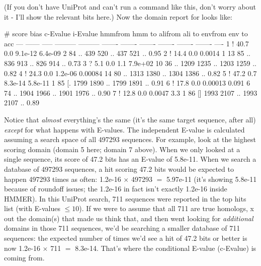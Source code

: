 
(If you don't have UniProt and can't run a command like this, don't
worry about it - I'll show the relevant bits here.) Now the domain
report for  looks like:

\begin{sreoutput}
   #    score  bias  c-Evalue  i-Evalue hmmfrom  hmm to    alifrom  ali to    envfrom  env to     acc
 ---   ------ ----- --------- --------- ------- -------    ------- -------    ------- -------    ----
   1 !   40.7   0.0   9.1e-12   6.4e-09       2      84 ..     439     520 ..     437     521 .. 0.95
   2 !   14.4   0.0    0.0014         1      13      85 ..     836     913 ..     826     914 .. 0.73
   3 ?    5.1   0.0       1.1   7.9e+02      10      36 ..    1209    1235 ..    1203    1259 .. 0.82
   4 !   24.3   0.0   1.2e-06   0.00084      14      80 ..    1313    1380 ..    1304    1386 .. 0.82
   5 !   47.2   0.7   8.3e-14   5.8e-11       1      85 [.    1799    1890 ..    1799    1891 .. 0.91
   6 !   17.8   0.0   0.00013     0.091       6      74 ..    1904    1966 ..    1901    1976 .. 0.90
   7 !   12.8   0.0    0.0047       3.3       1      86 []    1993    2107 ..    1993    2107 .. 0.89
\end{sreoutput}

Notice that \emph{almost} everything's the same (it's the same target
sequence, after all) \emph{except} for what happens with E-values. The
independent E-value is calculated assuming a search space of all
497293 sequences. For example, look at the highest scoring domain
(domain 5 here; domain 7 above). When we only looked at a single
sequence, its score of 47.2 bits has an E-value of 5.8e-11. When we
search a database of 497293 sequences, a hit scoring 47.2 bits would
be expected to happen 497293 times as often: 1.2e-16 $\times$ 497293
$=$ 5.97e-11 (it's showing 5.8e-11 because of roundoff issues; the
1.2e-16 in fact isn't exactly 1.2e-16 inside HMMER). In this UniProt
search, 711 sequences were reported in the top hits list (with
E-values $\leq 10$). If we were to assume that all 711 are true
homologs, x out the domain(s) that made us think that, and then went
looking for \emph{additional} domains in those 711 sequences, we'd be
searching a smaller database of 711 sequences: the expected number of
times we'd see a hit of 47.2 bits or better is now 1.2e-16 $\times$
711 $=$ 8.3e-14. That's where the conditional E-value (c-Evalue) is
coming from.

